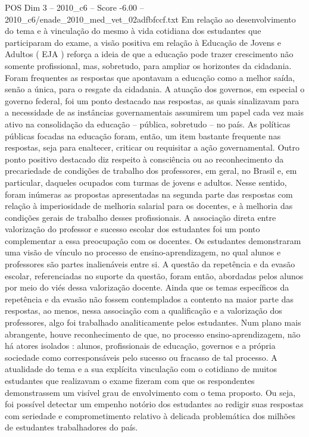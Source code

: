 \begin{textsample}{POS Dim 3 – 2010\_c6 – Score -6.00 – 2010\_c6/enade\_2010\_med\_vet\_02adfbfccf.txt}
Em relação ao desenvolvimento do tema e à vinculação do mesmo à vida cotidiana dos estudantes que participaram do exame, a visão positiva em relação à Educação de Jovens e Adultos ( EJA ) reforça a ideia de que a educação pode trazer crescimento não somente profissional, mas, sobretudo, para ampliar os horizontes da cidadania.
Foram frequentes as respostas que apontavam a educação como a melhor saída, senão a única, para o resgate da cidadania.
A atuação dos governos, em especial o governo federal, foi um ponto destacado nas respostas, as quais sinalizavam para a necessidade de as instâncias governamentais assumirem um papel cada vez mais ativo na consolidação da educação – pública, sobretudo – no país.
As políticas públicas focadas na educação foram, então, um item bastante frequente nas respostas, seja para enaltecer, criticar ou requisitar a ação governamental.
Outro ponto positivo destacado diz respeito à consciência ou ao reconhecimento da precariedade de condições de trabalho dos professores, em geral, no Brasil e, em particular, daqueles ocupados com turmas de jovens e adultos.
Nesse sentido, foram inúmeras as propostas apresentadas na segunda parte das respostas com relação à imperiosidade de melhoria salarial para os docentes, e à melhoria das condições gerais de trabalho desses profissionais.
A associação direta entre valorização do professor e sucesso escolar dos estudantes foi um ponto complementar a essa preocupação com os docentes.
Os estudantes demonstraram uma visão de vínculo no processo de ensino-aprendizagem, no qual alunos e professores são partes inalienáveis entre si.
A questão da repetência e da evasão escolar, referenciadas no suporte da questão, foram então, abordadas pelos alunos por meio do viés dessa valorização docente.
Ainda que os temas específicos da repetência e da evasão não fossem contemplados a contento na maior parte das respostas, ao menos, nessa associação com a qualificação e a valorização dos professores, algo foi trabalhado analiticamente pelos estudantes.
Num plano mais abrangente, houve reconhecimento de que, no processo ensino-aprendizagem, não há atores isolados : alunos, profissionais de educação, governos e a própria sociedade como corresponsáveis pelo sucesso ou fracasso de tal processo.
A atualidade do tema e a sua explícita vinculação com o cotidiano de muitos estudantes que realizavam o exame fizeram com que os respondentes demonstrassem um visível grau de envolvimento com o tema proposto.
Ou seja, foi possível detectar um empenho notório dos estudantes ao redigir suas respostas com seriedade e comprometimento relativo à delicada problemática dos milhões de estudantes trabalhadores do país.

\end{textsample}
